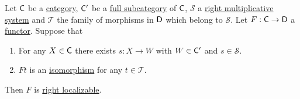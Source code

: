 \documentclass[../../main]{subfiles}
\begin{document}
\begin{proposition}\label{prop:conditions-for-localization}
  Let \(\mathsf{C}\) be a \hyperref[def:category]{category}, \(\mathsf{C'}\) be a \hyperref[def:subcategory]{full subcategory} of \(\mathsf{C}\), \(\mathcal{S}\) a \hyperref[def:multiplicative-system]{right multiplicative system} and \(\mathcal{T}\) the family of morphisms in \(\mathsf{D}\) which belong to \(\mathcal{S}\).
  Let \(F: \mathsf{C} \to \mathsf{D}\) a \hyperref[def:functor]{functor}.
  Suppose that
  \begin{enumerate}
    \item For any \(X \in \mathsf{C}\) there exists \(s: X \to W\) with \(W \in \mathsf{C'}\) and \(s \in \mathcal{S}\).
    \item \(Ft\) is an \hyperref[def:categorical-isomorphism]{isomorphism} for any \(t \in \mathcal{T}\).
  \end{enumerate}
  Then \(F\) is \hyperref[def:localization-functor]{right localizable}.
\end{proposition}
\end{document}
